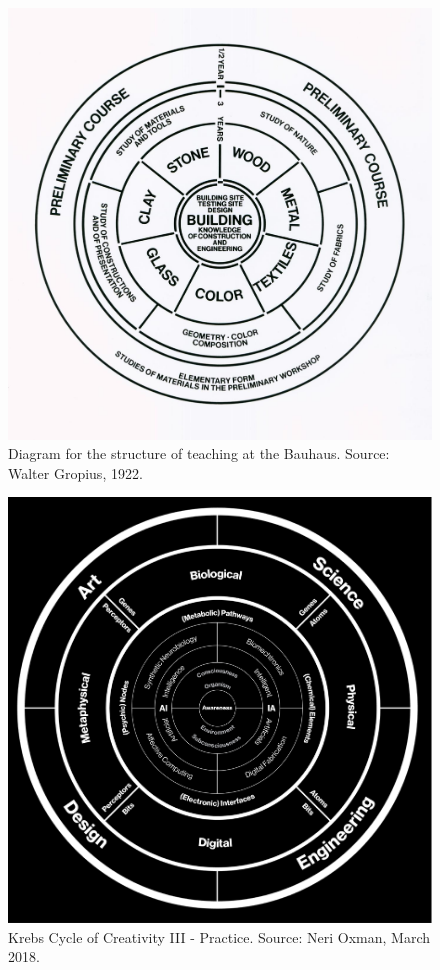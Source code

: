 \begin{figure}[h]
 \centering
 \includegraphics[width=1\textwidth]{pictures/bauhaus-curriculum-diagram}
 \caption{Diagram for the structure of teaching at the Bauhaus. Source: Walter Gropius, 1922.}
 \label{fig:bauhaus}
\end{figure}

\begin{figure}[h]
 \centering
 \includegraphics[width=1\textwidth]{pictures/krebs3}
 \caption{Krebs Cycle of Creativity III - Practice. Source: Neri Oxman, March 2018.}
 \label{fig:krebs3}
\end{figure}

